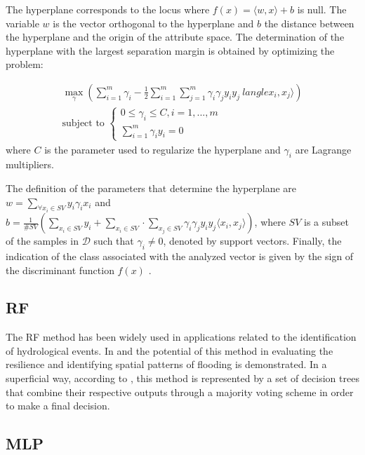 The hyperplane corresponds to the locus where \(f(x)=\langle w,x \rangle+b\) is null. The variable \(w\) is the vector orthogonal to the hyperplane and \(b\) the distance between the hyperplane and the origin of the attribute space.
The determination of the hyperplane with the largest separation margin is obtained by optimizing the \cite{theodoridis2010introduction} problem:

\begin{equation}
	\begin{array}{l}
		\max_\gamma (\sum^m_{i=1} \gamma_i-\frac{1}{2}\sum^m_{i=1}\sum^m_{j=1}\gamma_i \gamma_j y_i y_j \ langle x_i,x_j \rangle) \\
		
		\textrm{subject to } \begin{cases}
			0 \leq \gamma_i \leq C, i=1,...,m \\
			\sum^m_{i=1} \gamma_i y_i=0
		\end{cases}
	\end{array}
\end{equation}
where $C$ is the parameter used to regularize the hyperplane and \(\gamma_i\) are Lagrange multipliers.

The definition of the parameters that determine the hyperplane are $w=\sum_{\forall x_i \in SV}y_i \gamma_i x_i$ and $b=\frac{1}{\#SV}(\sum_{x_i \in SV} y_i+ \sum_{x_i \in SV} \cdot \sum_{x_j \in SV} \gamma_i \gamma_j y_i y_j \langle x_i,x_j \rangle)$, where $SV$ is a subset of the samples in \(\mathcal{ D}\) such that $\gamma_i \neq 0$, denoted by support vectors. Finally, the indication of the class associated with the analyzed vector is given by the sign of the discriminant function \(f(x)\) \cite{maselli2019integraccao}.

\subsection{RF}

The RF method has been widely used in applications related to the identification of hydrological events. In  and  the potential of this method in evaluating the resilience and identifying spatial patterns of flooding is demonstrated.
In a superficial way, according to , this method is represented by a set of decision trees that combine their respective outputs through a majority voting scheme in order to make a final decision.

\subsection{MLP}

